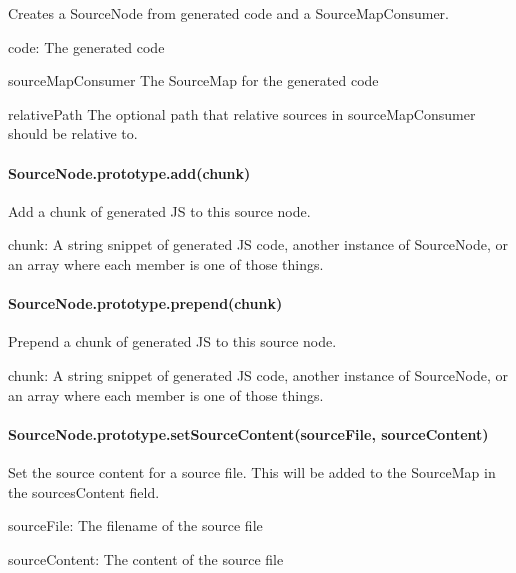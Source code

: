 Creates a Source\+Node from generated code and a Source\+Map\+Consumer.


\begin{DoxyItemize}
\item {\ttfamily code}\+: The generated code
\item {\ttfamily source\+Map\+Consumer} The Source\+Map for the generated code
\item {\ttfamily relative\+Path} The optional path that relative sources in {\ttfamily source\+Map\+Consumer} should be relative to.
\end{DoxyItemize}

\paragraph*{Source\+Node.\+prototype.\+add(chunk)}

Add a chunk of generated JS to this source node.


\begin{DoxyItemize}
\item {\ttfamily chunk}\+: A string snippet of generated JS code, another instance of {\ttfamily Source\+Node}, or an array where each member is one of those things.
\end{DoxyItemize}

\paragraph*{Source\+Node.\+prototype.\+prepend(chunk)}

Prepend a chunk of generated JS to this source node.


\begin{DoxyItemize}
\item {\ttfamily chunk}\+: A string snippet of generated JS code, another instance of {\ttfamily Source\+Node}, or an array where each member is one of those things.
\end{DoxyItemize}

\paragraph*{Source\+Node.\+prototype.\+set\+Source\+Content(source\+File, source\+Content)}

Set the source content for a source file. This will be added to the {\ttfamily Source\+Map} in the {\ttfamily sources\+Content} field.


\begin{DoxyItemize}
\item {\ttfamily source\+File}\+: The filename of the source file
\item {\ttfamily source\+Content}\+: The content of the source file
\end{DoxyItemize}

